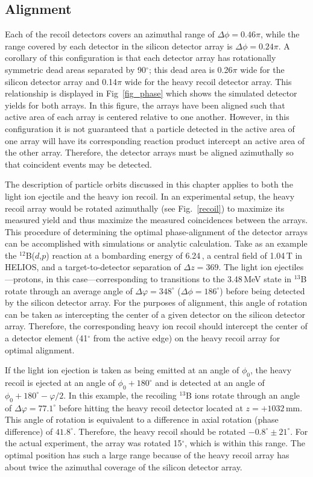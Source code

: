 \subsection{Alignment}
Each of the recoil detectors covers an azimuthal range of $\Delta \phi = 0.46\pi$, while the range covered by each detector in the silicon detector array is  $\Delta \phi = 0.24\pi$.  A corollary of this configuration is that each detector array has rotationally symmetric dead areas separated by 90$^\circ$; this dead area is 0.26$\pi$ wide for the silicon detector array and 0.14$\pi$ wide for the heavy recoil detector array.  This relationship is displayed in Fig~\ref{fig_phase} which shows the simulated detector yields for both arrays.  In this figure, the arrays have been aligned such that active area of each array is centered relative to one another.  However, in this configuration it is not guaranteed that a particle detected in the active area of one array will have its corresponding reaction product intercept an active area of the other array.  Therefore, the detector arrays must be aligned azimuthally so that coincident events may be detected.

The description of particle orbits discussed in this chapter applies to both the light ion ejectile and the heavy ion recoil.  In an experimental setup, the heavy recoil array would be rotated azimuthally (see Fig.~\ref{recoil}) to maximize its measured yield and thus maximize the measured coincidences between the arrays.  This procedure of determining the optimal phase-alignment of the detector arrays can be accomplished with simulations or analytic calculation.  Take as an example the $^{12}$B($d$,$p$) reaction at a bombarding energy of 6.24\,\AMeV, a central field of 1.04\,T in HELIOS, and a target-to-detector separation of $\Delta z=369$.  The light ion ejectiles---protons, in this case---corresponding to transitions to the 3.48\,MeV state in $^{13}$B rotate through an average angle of $\Delta \varphi=348^\circ$ ($\Delta \phi=186^\circ$) before being detected by the silicon detector array.  For the purposes of alignment, this angle of rotation can be taken as intercepting the center of a given detector on the silicon detector array.  Therefore, the corresponding heavy ion recoil should intercept the center of a detector element (41$^\circ$ from the active edge) on the heavy recoil array for optimal alignment.

If the light ion ejection is taken as being emitted at an angle of $\phi_0$, the heavy recoil is ejected at an angle of $\phi_0+180^\circ$ and is detected at an angle of $\phi_0+180^\circ-\varphi/2$.  In this example, the recoiling $^{13}$B ions rotate through an angle of $\Delta \varphi=77.1^\circ$ before hitting the heavy 
recoil detector located at $z=+1032$\,mm.  This angle of rotation is equivalent to a difference in axial rotation (phase difference) of $41.8^\circ$.  Therefore, the heavy
 recoil should be rotated $-0.8^\circ\pm 21^\circ$.  For the actual experiment, the array was
  rotated 15$^\circ$, which is within this range.  The optimal position has such a large range because of the heavy recoil array has about twice the azimuthal coverage of the silicon detector array.

